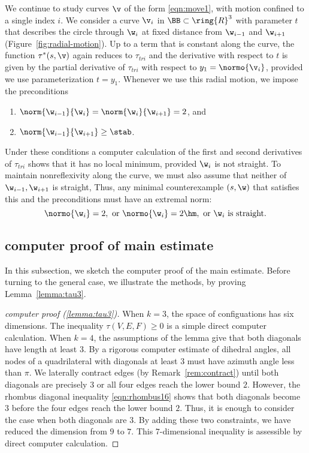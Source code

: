 \begin{remark}\label{rem:radial}
We continue to study curves $\v$ of the form \eqref{eqn:move1}, with
motion confined to a single index $i$.  We
consider a curve $\v_i$ in $\BB\subset\ring{R}^3$ with parameter $t$ that
describes the circle through $\w_i$ at fixed distance from $\w_{i-1}$ and
$\w_{i+1}$ (Figure~\ref{fig:radial-motion}). 
Up to a term that is constant along the curve, the function $\tau^*(s,\v)$ again reduces to
$\tau_{tri}$ and the derivative with respect to $t$ is given by the
partial derivative of $\tau_{tri}$ with respect to  $y_1=\normo{\v_i}$,
provided we use parameterization $t=y_1$.
 Whenever we use this radial motion, we impose the preconditions
\begin{enumerate}
\item $\norm{\w_{i-1}}{\w_i}=\norm{\w_i}{\w_{i+1}}=2$, and
\item $\norm{\w_{i-1}}{\w_{i+1}} \ge \stab$.
\end{enumerate}
Under these conditions a computer calculation of the first and second
derivatives of $\tau_{tri}$ shows that it has no local minimum, provided
$\w_i$ is not straight.
To maintain nonreflexivity along the curve, we must also assume that
 neither of $\w_{i-1},\w_{i+1}$ is straight,
Thus,  any minimal counterexample $(s,\w)$ that satisfies this and
the preconditions
must have an extremal norm:
\begin{equation}\label{eqn:extremal}
\normo{\w_i}=2,\text{ or } \normo{\w_i}=2\hm, \text{ or } \w_i
\text{ is straight.}
\end{equation}
\end{remark}

\figMVFCDJQ %


\subsection{computer proof of main estimate}

In this subsection, we sketch the computer proof of the main estimate.
Before turning to the general case, 
we illustrate the methods, by proving Lemma~\ref{lemma:tau3}.

\begin{proof}[computer proof (\ref{lemma:tau3})]
  When $k=3$, the space of configuations has six dimensions.  The
  inequality $\tau(V,E,F)\ge0$ is a simple direct computer calculation.  When
  $k=4$, the assumptions of the lemma give that both diagonals have
  length at least $3$.  By a rigorous computer estimate of dihedral
  angles, all nodes of a quadrilateral with diagonals at least $3$
  must have azimuth angle less than $\pi$.  We laterally contract edges (by
  Remark~\ref{rem:contract}) until both diagonals are precisely $3$ or
  all four edges reach the lower bound $2$.  However, the rhombus
  diagonal inequality \eqref{eqn:rhombus16} shows that both diagonals
  become $3$ before the four edges reach the lower bound $2$.  Thus,
  it is enough to consider the case when both diagonals are $3$.  By
  adding these two constraints, we have reduced the dimension from $9$
  to $7$. This $7$-dimensional inequality is assessible by direct
  computer calculation.
\end{proof}


